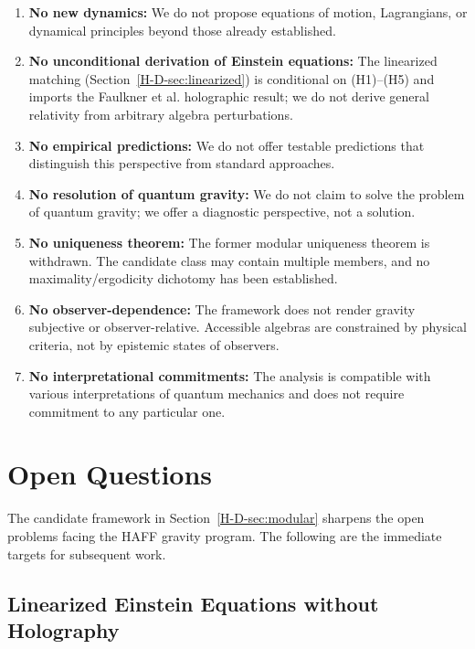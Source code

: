 \documentclass[12pt,a4paper,openany]{book}
\begin{document}
\begin{enumerate}
    \item \textbf{No new dynamics:} We do not propose equations of motion, Lagrangians, or dynamical principles beyond those already established.
    
    \item \textbf{No unconditional derivation of Einstein equations:} The linearized matching (Section~\ref{H-D-sec:linearized}) is conditional on (H1)--(H5) and imports the Faulkner et al. holographic result; we do not derive general relativity from arbitrary algebra perturbations.
    
    \item \textbf{No empirical predictions:} We do not offer testable predictions that distinguish this perspective from standard approaches.
    
    \item \textbf{No resolution of quantum gravity:} We do not claim to solve the problem of quantum gravity; we offer a diagnostic perspective, not a solution.

    \item \textbf{No uniqueness theorem:} The former modular uniqueness theorem is withdrawn.  The candidate class may contain multiple members, and no maximality/ergodicity dichotomy has been established.
    
    \item \textbf{No observer-dependence:} The framework does not render gravity subjective or observer-relative. Accessible algebras are constrained by physical criteria, not by epistemic states of observers.
    
    \item \textbf{No interpretational commitments:} The analysis is compatible with various interpretations of quantum mechanics and does not require commitment to any particular one.
\end{enumerate}

\section{Open Questions}
\label{H-D-sec:open}

The candidate framework in Section~\ref{H-D-sec:modular} sharpens the open problems facing the HAFF gravity program. The following are the immediate targets for subsequent work.

\subsection{Linearized Einstein Equations without Holography}
\end{document}
